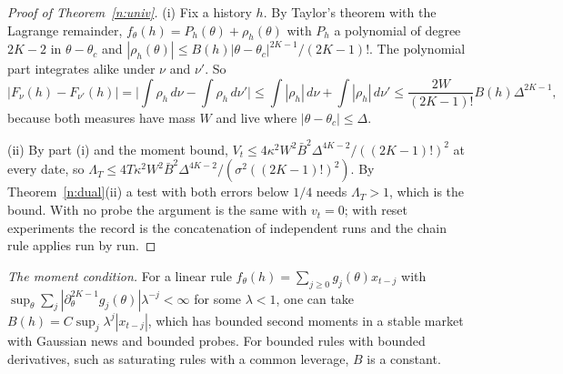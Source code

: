 \begin{proof}[Proof of Theorem~\ref{n:univ}]
(i) Fix a history $h$. By Taylor's theorem with the Lagrange remainder, $f_\theta(h)=P_h(\theta)+\rho_h(\theta)$ with $P_h$ a polynomial of degree $2K-2$ in $\theta-\theta_c$ and $|\rho_h(\theta)|\le B(h)|\theta-\theta_c|^{2K-1}/(2K-1)!$. The polynomial part integrates alike under $\nu$ and $\nu'$. So
\[
|F_\nu(h)-F_{\nu'}(h)|=\Big|\int\rho_h\,d\nu-\int\rho_h\,d\nu'\Big|\le\int|\rho_h|\,d\nu+\int|\rho_h|\,d\nu'\le\frac{2W}{(2K-1)!}B(h)\Delta^{2K-1},
\]
because both measures have mass $W$ and live where $|\theta-\theta_c|\le\Delta$.

(ii) By part (i) and the moment bound, $V_t\le4\kappa^2W^2\bar B^2\Delta^{4K-2}/((2K-1)!)^2$ at every date, so $\Lambda_T\le4T\kappa^2W^2\bar B^2\Delta^{4K-2}/(\sigma^2((2K-1)!)^2)$. By Theorem~\ref{n:dual}(ii) a test with both errors below $1/4$ needs $\Lambda_T>1$, which is the bound. With no probe the argument is the same with $v_t=0$; with reset experiments the record is the concatenation of independent runs and the chain rule applies run by run.
\end{proof}

\noindent\emph{The moment condition.} For a linear rule $f_\theta(h)=\sum_{j\ge0}g_j(\theta)x_{t-j}$ with $\sup_\theta\sum_j|\partial_\theta^{2K-1}g_j(\theta)|\lambda^{-j}<\infty$ for some $\lambda<1$, one can take $B(h)=C\sup_j\lambda^j|x_{t-j}|$, which has bounded second moments in a stable market with Gaussian news and bounded probes. For bounded rules with bounded derivatives, such as saturating rules with a common leverage, $B$ is a constant.

